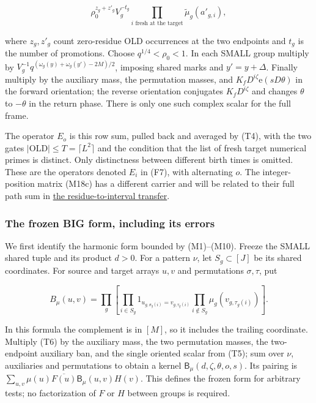 \[
\rho_0^{z_g+z'_g}V_g^{-t_g}
 \prod_{i\text{ fresh at the target}}\widetilde\mu_g(a'_{g,i}),
\tag{T5}
\]

where \(z_g,z'_g\) count zero-residue OLD occurrences at the two
endpoints and \(t_g\) is the number of promotions. Choose
\(q^{1/4}<\rho_0<1\). In each SMALL group multiply by
\(V_g^{-1}q^{(\omega_g(y)+\omega_g(y')-2M)/2}\), imposing shared marks
and \(y'=y+\Delta\). Finally multiply by the auxiliary mass, the
permutation masses, and \(K_fD^{i\zeta}\mathrm e(sD\theta)\) in the
forward orientation; the reverse orientation conjugates
\(K_fD^{i\zeta}\) and changes \(\theta\) to \(-\theta\) in the return
phase. There is only one such complex scalar for the full frame.

The operator \(E_o\) is this row sum, pulled back and averaged by (T4),
with the two gates \(|\mathrm{OLD}|\le T=\lceil L^2\rceil\) and the
condition that the list of fresh target numerical primes is distinct.
Only distinctness between different birth times is omitted. These are
the operators denoted \(E_i\) in (F7), with alternating \(o\). The
integer-position matrix (M18c) has a different carrier and will be
related to their full path sum in
\protect\hyperlink{marked-correlation-from-residue-averages-to-the-integer-interval}{the
residue-to-interval transfer}.


\hypertarget{marked-correlation-the-frozen-big-form-including-its-errors}{%
\subsubsection{The frozen BIG form, including its
errors}\label{marked-correlation-the-frozen-big-form-including-its-errors}}

We first identify the harmonic form bounded by (M1)--(M10). Freeze the
SMALL shared tuple and its product \(d>0\). For a pattern \(\nu\), let
\(S_g\subset[J]\) be its shared coordinates. For source and target
arrays \(u,v\) and permutations \(\sigma,\tau\), put

\[
B_\mu(u,v)=\prod_g\left[
 \prod_{i\in S_g}1_{u_{g,\sigma_g(i)}=v_{g,\tau_g(i)}}
 \prod_{i\notin S_g}\mu_g(v_{g,\tau_g(i)})\right].
\tag{T6}
\]

In this formula the complement is in \([M]\), so it includes the
trailing coordinate. Multiply (T6) by the auxiliary mass, the two
permutation masses, the two-endpoint auxiliary ban, and the single
oriented scalar from (T5); sum over \(\nu\), auxiliaries and
permutations to obtain a kernel \(\mathsf B_\mu(d,\zeta,\theta,o,s)\).
Its pairing is
\(\sum_{u,v}\mu(u)\overline{F(u)}\mathsf B_\mu(u,v)H(v)\). This defines
the frozen form for arbitrary tests; no factorization of \(F\) or \(H\)
between groups is required.

